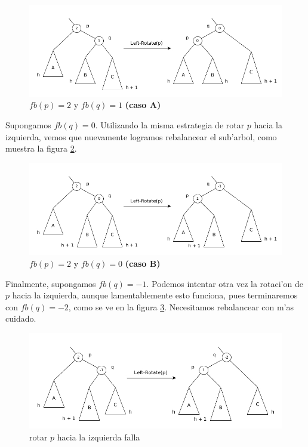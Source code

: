 \begin{figure}[H]
	\begin{center}
		\includegraphics[scale=0.55]{imagenes/fig9.jpg}
	\end{center}
	\caption{$fb(p) = 2$ y $fb(q) = 1$ \textbf{(caso A)}}
	\label{fig9}
\end{figure}

Supongamos $fb(q) = 0$. Utilizando la misma estrategia de rotar $p$ hacia la izquierda, vemos que nuevamente logramos rebalancear el sub'arbol, como muestra la figura \ref{fig10}.

\begin{figure}[H]
	\begin{center}
		\includegraphics[scale=0.55]{imagenes/fig10.jpg}
	\end{center}
	\caption{$fb(p) = 2$ y $fb(q) = 0$ \textbf{(caso B)}}
	\label{fig10}
\end{figure}

Finalmente, supongamos $fb(q) = -1$. Podemos intentar otra vez la rotaci'on de $p$ hacia la izquierda, aunque lamentablemente esto funciona, pues terminaremos con $fb(q) = -2$, como se ve en la figura \ref{fig11}. Necesitamos rebalancear con m'as cuidado.

\begin{figure}[H]
	\begin{center}
		\includegraphics[scale=0.55]{imagenes/fig11.jpg}
	\end{center}
	\caption{rotar $p$ hacia la izquierda falla}
	\label{fig11}
\end{figure}

